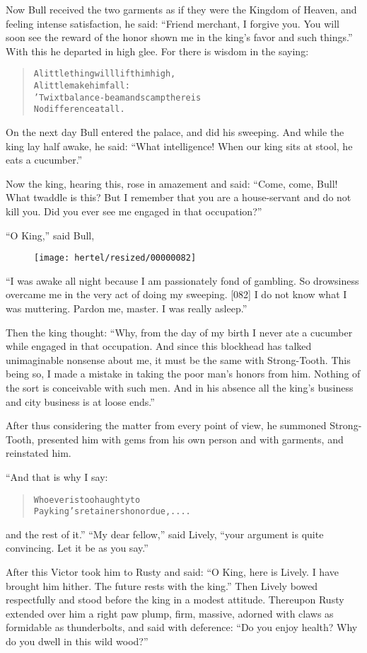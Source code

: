 \documentclass[article, twoside, 10pt]{memoir}
\renewenvironment{verbatim}{%
\begin{quote}%
\vskip -10pt%
\begin{alltt}\normalfont\small}{\end{alltt}%
\end{quote}%
\vskip -10pt
} %
\begin{document}
Now Bull received the two garments as if they were the Kingdom of
Heaven, and feeling intense satisfaction, he said:
``Friend merchant, I forgive you. You will soon see the reward of the honor shown me in the king's favor and such things.''
With this he departed in high glee. For there is wisdom in the
saying:

\begin{verbatim}
A little thing will lift him high,
    A little make him fall:
'Twixt balance-beam and scamp there is
    No difference at all.
\end{verbatim}
On the next day Bull entered the palace, and did his sweeping. And
while the king lay half awake, he said:
``What intelligence! When our king sits at stool, he eats a cucumber.''

Now the king, hearing this, rose in amazement and said:
``Come, come, Bull! What twaddle is this? But I remember that you are a house-servant and do not kill you. Did you ever see me engaged in that occupation?''

``O King,'' said Bull,
\begin{figure}[p]\texttt{[image: hertel/resized/00000082]}\end{figure}``I was awake all night because I am passionately fond of gambling. So drowsiness overcame me in the very act of doing my sweeping. [082] I do not know what I was muttering. Pardon me, master. I was really asleep.''

Then the king thought:
``Why, from the day of my birth I never ate a cucumber while engaged in that occupation. And since this blockhead has talked unimaginable nonsense about me, it must be the same with Strong-Tooth. This being so, I made a mistake in taking the poor man's honors from him. Nothing of the sort is conceivable with such men. And in his absence all the king's business and city business is at loose ends.''

After thus considering the matter from every point of view, he
summoned Strong-Tooth, presented him with gems from his own person
and with garments, and reinstated him.

“And that is why I say:

\begin{verbatim}
Whoever is too haughty to
Pay king's retainers honor due, ....
\end{verbatim}
and the rest of it.” ``My dear fellow,'' said Lively,
``your argument is quite convincing. Let it be as you say.''

After this Victor took him to Rusty and said:
``O King, here is Lively. I have brought him hither. The future rests with the king.''
Then Lively bowed respectfully and stood before the king in a
modest attitude. Thereupon Rusty extended over him a right paw
plump, firm, massive, adorned with claws as formidable as
thunderbolts, and said with deference:
``Do you enjoy health? Why do you dwell in this wild wood?''
\end{document}
